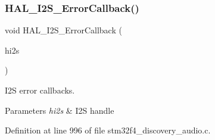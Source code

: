 \subsubsection{\texorpdfstring{H\+A\+L\+\_\+\+I2\+S\+\_\+\+Error\+Callback()}{HAL\_I2S\_ErrorCallback()}}
{\footnotesize\ttfamily void H\+A\+L\+\_\+\+I2\+S\+\_\+\+Error\+Callback (\begin{DoxyParamCaption}\item[{I2\+S\+\_\+\+Handle\+Type\+Def $\ast$}]{hi2s }\end{DoxyParamCaption})}



I2S error callbacks. 


\begin{DoxyParams}{Parameters}
{\em hi2s} & I2S handle \\
\hline
\end{DoxyParams}


Definition at line 996 of file stm32f4\+\_\+discovery\+\_\+audio.\+c.

